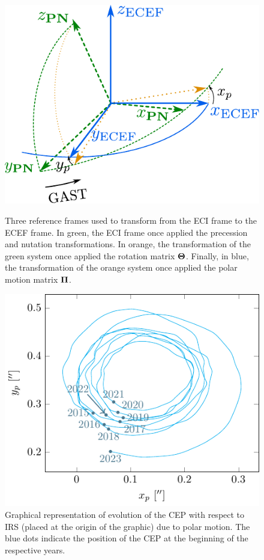 \documentclass[../main.tex]{subfiles}
\begin{document}
\begin{figure}[htbp]
  \centering
  \begin{minipage}[t]{0.45\textwidth}
    \centering
    \includegraphics[width=\textwidth]{Images/polar_motion_matrix.pdf}
    \caption{Three reference frames used to transform from the ECI frame to the ECEF frame. In green, the ECI frame once applied the precession and nutation transformations. In orange, the transformation of the green system once applied the rotation matrix $\boldsymbol{\mathrm{\Theta}}$. Finally, in blue, the transformation of the orange system once applied the polar motion matrix $\boldsymbol{\mathrm{\Pi}}$.}
    \label{fig:polar_motion_matrix}
  \end{minipage}
  \hfill
  \begin{minipage}[t]{0.45\textwidth}
    \centering
    \includegraphics[width=\textwidth]{Images/polar_motion.pdf}
    \caption{Graphical representation of evolution of the CEP with respect to IRS (placed at the origin of the graphic) due to polar motion. The blue dots indicate the position of the CEP at the beginning of the respective years.}
    \label{fig:polar_motion}
  \end{minipage}
\end{figure}
\end{document}
